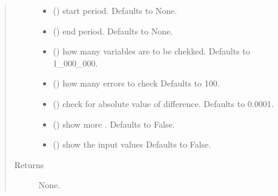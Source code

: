 \documentclass[letterpaper,10pt,english]{sphinxmanual}
\begin{document}
\begin{fulllineitems}
\begin{fulllineitems}
\begin{quote}
\begin{description}
\begin{itemize}
\item {} 
\sphinxAtStartPar
{} (\sphinxstyleliteralemphasis{\sphinxupquote{, }}) \textendash{} start period. Defaults to None.

\item {} 
\sphinxAtStartPar
{} (\sphinxstyleliteralemphasis{\sphinxupquote{, }}) \textendash{} end period. Defaults to None.

\item {} 
\sphinxAtStartPar
{} (\sphinxstyleliteralemphasis{\sphinxupquote{, }}) \textendash{} how many variables are to be chekked. Defaults to 1\_000\_000.

\item {} 
\sphinxAtStartPar
{} (\sphinxstyleliteralemphasis{\sphinxupquote{, }}) \textendash{} how many errors to check Defaults to 100.

\item {} 
\sphinxAtStartPar
{} (\sphinxstyleliteralemphasis{\sphinxupquote{, }}) \textendash{} check for absolute value of difference. Defaults to 0.0001.

\item {} 
\sphinxAtStartPar
{} (\sphinxstyleliteralemphasis{\sphinxupquote{, }}) \textendash{} show more . Defaults to False.

\item {} 
\sphinxAtStartPar
{} (\sphinxstyleliteralemphasis{\sphinxupquote{, }}) \textendash{} show the input values Defaults to False.

\end{itemize}

\item[{Returns}] \leavevmode
\sphinxAtStartPar
None.

\end{description}\end{quote}

\end{fulllineitems}


\end{fulllineitems}
\end{document}
